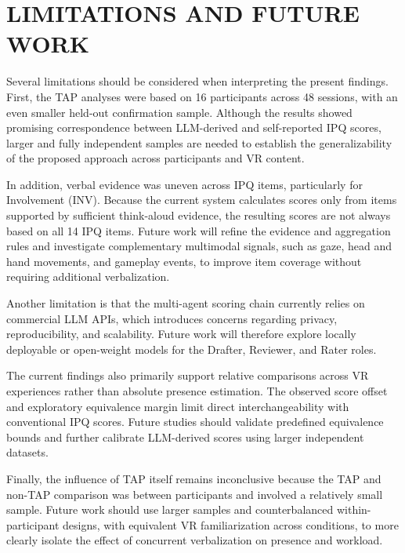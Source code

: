 \section{LIMITATIONS AND FUTURE WORK}
\label{sec:limitations}

Several limitations should be considered when interpreting the present findings.
First, the TAP analyses were based on 16 participants across 48 sessions, with an even smaller held-out confirmation sample. Although the results showed promising correspondence between LLM-derived and self-reported IPQ scores, larger and fully independent samples are needed to establish the generalizability of the proposed approach across participants and VR content.

In addition, verbal evidence was uneven across IPQ items, particularly for Involvement (INV). Because the current system calculates scores only from items supported by sufficient think-aloud evidence, the resulting scores are not always based on all 14 IPQ items. Future work will refine the evidence and aggregation rules and investigate complementary multimodal signals, such as gaze, head and hand movements, and gameplay events, to improve item coverage without requiring additional verbalization.

Another limitation is that the multi-agent scoring chain currently relies on commercial LLM APIs, which introduces concerns regarding privacy, reproducibility, and scalability. Future work will therefore explore locally deployable or open-weight models for the Drafter, Reviewer, and Rater roles.

The current findings also primarily support relative comparisons across VR experiences rather than absolute presence estimation. The observed score offset and exploratory equivalence margin limit direct interchangeability with conventional IPQ scores. Future studies should validate predefined equivalence bounds and further calibrate LLM-derived scores using larger independent datasets.

Finally, the influence of TAP itself remains inconclusive because the TAP and non-TAP comparison was between participants and involved a relatively small sample. Future work should use larger samples and counterbalanced within-participant designs, with equivalent VR familiarization across conditions, to more clearly isolate the effect of concurrent verbalization on presence and workload.

